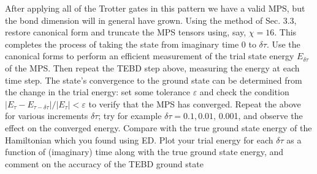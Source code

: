 \documentclass[12pt]{article}
\begin{document}
After applying all of the Trotter gates in this pattern we have a valid MPS, but the bond dimension will in general have grown. Using the method of Sec. 3.3, restore canonical form and truncate the MPS tensors using, say, $\chi=16$. This completes the process of taking the state from imaginary time 0 to $\delta \tau$. Use the canonical forms to perform an efficient measurement of the trial state energy $E_{\delta \tau}$ of the MPS. Then repeat the TEBD step above, measuring the energy at each time step. The state's convergence to the ground state can be determined from the change in the trial energy: set some tolerance $\varepsilon$ and check the condition $\left|E_{\tau}-E_{\tau-\delta \tau}\right| /\left|E_{\tau}\right|<\varepsilon$ to verify that the MPS has converged. Repeat the above for various increments $\delta \tau$; try for example $\delta \tau=0.1,0.01$, 0.001, and observe the effect on the converged energy. Compare with the true ground state energy of the Hamiltonian which you found using ED. Plot your trial energy for each $\delta \tau$ as a function of (imaginary) time along with the true ground state energy, and comment on the accuracy of the TEBD ground state\newpage
\end{document}
